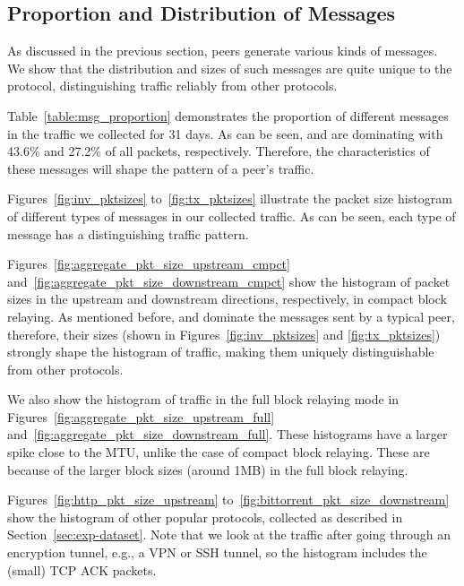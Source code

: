 

\subsection{Proportion and Distribution of Messages} \label{sec:prop_dist_msg}

As discussed in the previous section, \bc peers generate various kinds of messages. 
We show that the distribution and sizes of such messages are quite unique to the \bc protocol, 
distinguishing \bc traffic reliably from other protocols. 


Table~\ref{table:msg_proportion} demonstrates the proportion of different messages in the \bc traffic we collected 
for 31 days. As can be seen,  and  are dominating with 43.6\% and 27.2\% of all packets, respectively. 
Therefore, the characteristics of these messages will shape the pattern of a \bc peer's traffic. 



Figures~\ref{fig:inv_pktsizes} to~\ref{fig:tx_pktsizes} illustrate
the  packet size histogram of 
different types of \bc messages in our collected \bc traffic.
As can be seen, each type of message has a distinguishing traffic pattern. 


Figures~\ref{fig:aggregate_pkt_size_upstream_cmpct} and~\ref{fig:aggregate_pkt_size_downstream_cmpct} show the histogram of packet sizes in the upstream and downstream directions, respectively, in compact block relaying. 
As mentioned before,  and  dominate the messages sent by a typical \bc peer, therefore, their sizes 
(shown in Figures~\ref{fig:inv_pktsizes} and \ref{fig:tx_pktsizes}) strongly shape the histogram of \bc traffic, making them uniquely distinguishable from other protocols. 

We also show the histogram of \bc traffic in the full block relaying mode in Figures~\ref{fig:aggregate_pkt_size_upstream_full} and~\ref{fig:aggregate_pkt_size_downstream_full}. These histograms have a larger spike close to the MTU, unlike the case of compact block relaying. These are because of the larger block sizes (around 1MB) in the full block relaying. 

Figures~\ref{fig:http_pkt_size_upstream} to~\ref{fig:bittorrent_pkt_size_downstream}  show the histogram of other popular protocols, collected as described in Section~\ref{sec:exp-dataset}. Note that we look at the traffic after going through an encryption tunnel, e.g., a VPN or SSH tunnel, so the histogram includes the (small) TCP ACK packets. 

